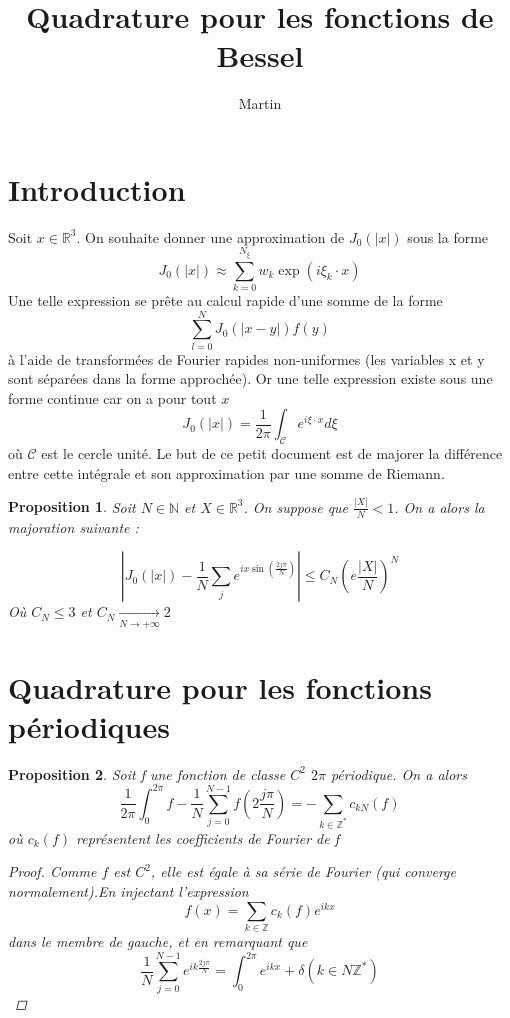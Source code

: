 \documentclass[11pt,a4paper]{article}
\author{Martin}
\title{Quadrature pour les fonctions de Bessel}
\begin{document}
\renewcommand{\proofname}{Preuve}
\maketitle
\theoremstyle{plain}
\newtheorem{The}{Théorème}[section]
\newtheorem{Prop}{Proposition}[section]
\theoremstyle{definition}
\newtheorem{Def}{Définition}[section]
\newcommand{\enstq}[2]{\left\{#1\mathrel{}\middle|\mathrel{}#2\right\}}
\newcommand{\Lp}[2]{L^#1(#2)}
\newcommand{\Sob}[3]{W^{#1,#2}(#3)}
\newcommand{\RN}[0]{\mathbb{R}^N}
\newcommand{\norm}[1]{\left\|#1\right\|}
\newcommand{\sinc}[0]{\textup{sinc}}

\section{Introduction}

Soit $x \in \mathbb{R}^3$. On souhaite donner une approximation de $J_0(|x|)$ sous la forme 
\[J_0(|x|) \approx \sum_{k=0}^{N_\xi} w_k \exp(i\xi_k\cdot x)\]Une telle expression se prête au calcul rapide d'une somme de la forme \[\sum_{l=0}^N J_0(|x-y|)f(y)\] à l'aide de transformées de Fourier rapides non-uniformes (les variables x et y sont séparées dans la forme approchée). Or une telle expression existe sous une forme continue car on a pour tout $x$ \[J_0(|x|) = \frac{1}{2\pi}\int_{\mathcal{C}} e^{i\xi \cdot x} d\xi\] où $\mathcal{C}$ est le cercle unité. Le but de ce petit document est de majorer la différence entre cette intégrale et son approximation par une somme de Riemann. 

\begin{Prop} Soit $N\in \mathbb{N}$ et $X\in \mathbb{R}^3$. On suppose que $\frac{|X|}{N}  < 1$. On a alors la majoration suivante : 

\begin{equation}
\left| J_0(|x|) - \frac{1}{N}\sum_{j} e^{ix\sin\left(\frac{2j\pi}{N}\right)}\right|\leq C_N \left(e\frac{|X|}{N} \right)^N
\label{Erreur}
\end{equation}
Où $C_N \leq 3$ et $C_N \underset{N\to+\infty} {\to}2$
\end{Prop}

\section{Quadrature pour les fonctions périodiques}

\begin{Prop} \label{erreurRect}
Soit f une fonction de classe $C^2$ $2\pi$ périodique. On a alors \[\frac{1}{2\pi}\int_0^{2\pi}f - \frac{1}{N}\sum_{j = 0}^{N-1}f \left(2\frac{j\pi}{N}\right) = - \sum_{k\in \mathbb{Z}^*} c_{kN}(f)\] où $c_k(f)$ représentent les coefficients de Fourier de f

\begin{proof}
Comme $f$ est $C^2$, elle est égale à sa série de Fourier (qui converge normalement).En injectant l'expression \[f(x) = \sum_{k\in \mathbb{Z}} c_{k}(f)e^{ikx}\] dans le membre de gauche, et en remarquant que \[\frac{1}{N}\sum_{j=0}^{N-1}e^{ik\frac{2j \pi }{N}} = \int_0^{2\pi} e^{ikx} + \delta(k\in N\mathbb{Z}^*)\]
\end{proof}
\end{Prop}
\end{document}
